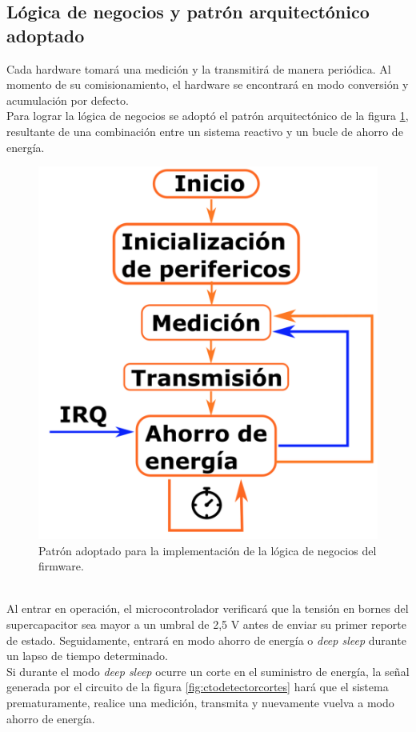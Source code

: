 \subsection{Lógica de negocios y patrón arquitectónico adoptado}
Cada hardware tomará una medición y la transmitirá de manera periódica. Al momento de su comisionamiento, el hardware se encontrará en modo conversión y acumulación por defecto.\\
Para lograr la lógica de negocios se adoptó el patrón arquitectónico de la figura \ref{fig:patronpowersaveloop}, resultante de una combinación entre un sistema reactivo y un bucle de ahorro de energía.\\
\begin{figure}[h!]
	\centering
	\includegraphics[width=0.8\linewidth]{Figures/patron_power_save_loop}
	\caption{Patrón adoptado para la implementación de la lógica de negocios del firmware.}
	\label{fig:patronpowersaveloop}
\end{figure}\\
Al entrar en operación, el microcontrolador verificará que la tensión en bornes del supercapacitor sea mayor a un umbral de 2,5 V antes de enviar su primer reporte de estado. Seguidamente, entrará en modo ahorro de energía o \textit{deep sleep} durante un lapso de tiempo determinado.\\
Si durante el modo \textit{deep sleep} ocurre un corte en el suministro de energía, la señal generada por el circuito de la figura \ref{fig:ctodetectorcortes} hará que el sistema prematuramente, realice una medición, transmita y nuevamente vuelva a modo ahorro de energía.\\

